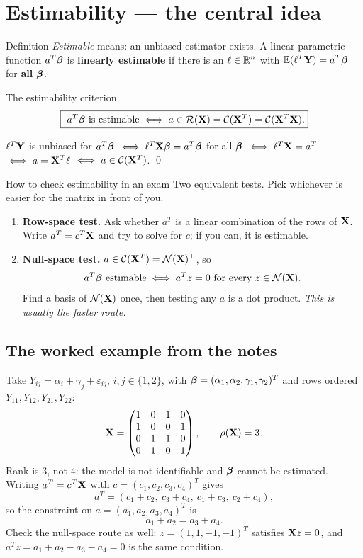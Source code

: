 \documentclass[11pt]{article}
\begin{document}
\section{Estimability --- the central idea}

\begin{idea}{Definition}
\emph{Estimable} means: an unbiased estimator exists. A linear parametric function
$a^T\boldsymbol{\beta}$ is \textbf{linearly estimable} if there is an $\ell\in\mathbb{R}^n$ with
$\mathbb{E}(\ell^T\mathbf{Y})=a^T\boldsymbol{\beta}$ for \textbf{all} $\boldsymbol{\beta}$.
\end{idea}

\begin{idea}{The estimability criterion}
\[
  \boxed{\ a^T\boldsymbol{\beta} \text{ is estimable} \iff a\in\mathcal{R}(\mathbf{X})=\mathcal{C}(\mathbf{X}^T)=\mathcal{C}(\mathbf{X}^T\mathbf{X}). }
\]
\end{idea}
\prf $\ell^T\mathbf{Y}$ is unbiased for $a^T\boldsymbol{\beta}$
$\iff \ell^T\mathbf{X}\boldsymbol{\beta}=a^T\boldsymbol{\beta}$ for all $\boldsymbol{\beta}$
$\iff \ell^T\mathbf{X}=a^T$
$\iff a=\mathbf{X}^T\ell$
$\iff a\in\mathcal{C}(\mathbf{X}^T)$. \qed

\begin{recipe}{How to check estimability in an exam}
Two equivalent tests. Pick whichever is easier for the matrix in front of you.
\begin{enumerate}
  \item \textbf{Row-space test.} Ask whether $a^T$ is a linear combination of the rows of
        $\mathbf{X}$. Write $a^T=c^T\mathbf{X}$ and try to solve for $c$; if you can, it is estimable.
  \item \textbf{Null-space test.} $a\in\mathcal{C}(\mathbf{X}^T)=\mathcal{N}(\mathbf{X})^\perp$, so
        \[
          a^T\boldsymbol{\beta} \text{ estimable} \iff a^Tz=0 \text{ for every } z\in\mathcal{N}(\mathbf{X}).
        \]
        Find a basis of $\mathcal{N}(\mathbf{X})$ once, then testing any $a$ is a dot product.
        \emph{This is usually the faster route.}
\end{enumerate}
\end{recipe}

\subsection{The worked example from the notes}

Take $Y_{ij}=\alpha_i+\gamma_j+\varepsilon_{ij}$, $i,j\in\{1,2\}$, with
$\boldsymbol{\beta}=(\alpha_1,\alpha_2,\gamma_1,\gamma_2)^T$ and rows ordered $Y_{11},Y_{12},Y_{21},Y_{22}$:
\[
  \mathbf{X}=\begin{pmatrix}1&0&1&0\\1&0&0&1\\0&1&1&0\\0&1&0&1\end{pmatrix},\qquad \rho(\mathbf{X})=3 .
\]
Rank is $3$, not $4$: the model is not identifiable and $\boldsymbol{\beta}$ cannot be estimated. Writing
$a^T=c^T\mathbf{X}$ with $c=(c_1,c_2,c_3,c_4)^T$ gives
\[
  a^T=(c_1+c_2,\ c_3+c_4,\ c_1+c_3,\ c_2+c_4),
\]
so the constraint on $a=(a_1,a_2,a_3,a_4)^T$ is
\[
  \boxed{a_1+a_2=a_3+a_4}.
\]
Check the null-space route as well: $z=(1,1,-1,-1)^T$ satisfies $\mathbf{X} z=0$, and
$a^Tz=a_1+a_2-a_3-a_4=0$ is the same condition.
\end{document}
